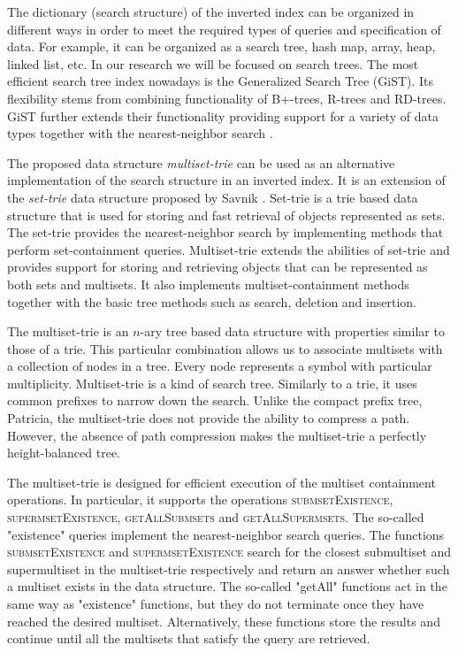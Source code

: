%

The dictionary (search structure) of the inverted index can be organized in different ways in 
order to meet the required types of queries and specification of data. For example, 
it can be organized as a search tree, hash map, array, heap, linked list, etc. In our 
research we will be focused on search trees. The most efficient search tree index 
nowadays is the Generalized Search Tree (GiST). Its flexibility stems from combining 
functionality of B+-trees, R-trees and RD-trees. GiST further extends their functionality 
providing support for a variety of data types together with the nearest-neighbor 
search \cite{broder2006indexing,hellerstein1995generalized,kornacker1999high}.

%
The proposed data structure \emph{multiset-trie} can be used as an alternative 
implementation of the search structure in an inverted index. It is an extension of 
the \emph{set-trie} data structure proposed by Savnik \cite{savnik2013index}. 
Set-trie is a trie based data structure that is used for storing and fast retrieval of 
objects represented as sets. The set-trie provides the nearest-neighbor search by 
implementing methods that perform set-containment queries. Multiset-trie extends 
the abilities of set-trie and provides support for storing and retrieving objects 
that can be represented as both sets and multisets. It also implements 
multiset-containment methods together with the basic tree methods such as search, 
deletion and insertion.

The multiset-trie is an $n$-ary tree based data structure with properties similar to 
those of a trie. 
This particular combination allows us to associate multisets with a collection 
of nodes in a tree. Every node represents a symbol with particular multiplicity. 
%
Multiset-trie is a kind of search tree. Similarly to a trie, it uses common prefixes 
to narrow down the search. Unlike the compact prefix tree, Patricia, the multiset-trie 
does not provide the ability to compress a path. However, the absence of path 
compression makes the multiset-trie a perfectly height-balanced tree.

The multiset-trie is designed for efficient execution of the multiset containment 
operations. In particular, it supports the operations \textsc{submsetExistence}, 
\textsc{supermsetExistence}, \textsc{getAllSubmsets} and \textsc{getAllSupermsets}. 
The so-called "existence" queries implement the nearest-neighbor search queries. The 
functions \textsc{submsetExistence} and \textsc{supermsetExistence} search for 
the closest submultiset and supermultiset in the multiset-trie respectively and return 
an answer whether such a multiset exists in the data structure. The so-called 
"getAll" functions act in the same way as "existence" functions, but they do not 
terminate once they have reached the desired multiset. Alternatively, these functions 
store the results and continue until all the multisets that satisfy the query are retrieved. 

